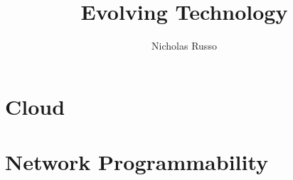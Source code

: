 \documentclass{article}
\author{Nicholas Russo}
\title{Evolving Technology}
\date{}
\begin{document}
\maketitle

\newpage
\begin{abstract}

\end{abstract}

\newpage
\tableofcontents
\listoffigures
\listoftables

\newpage
\section{Cloud}
\newcommand{\imgpath}{content/cloud/a1a-design/img/}






\renewcommand{\imgpath}{content/cloud/a1b-infra/img/}






\newpage
\section{Network Programmability}
\renewcommand{\imgpath}{content/netprog/a2a-archops/img/}





\end{document}
